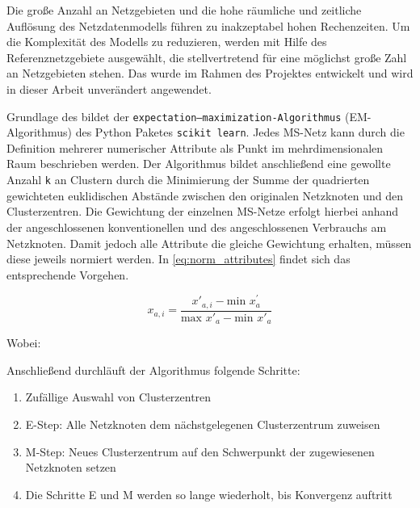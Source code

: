 Die große Anzahl an Netzgebieten und die hohe räumliche und zeitliche Auflösung des Netzdatenmodells führen zu inakzeptabel hohen Rechenzeiten.
Um die Komplexität des Modells zu reduzieren, werden mit Hilfe des \kmeans Referenznetzgebiete ausgewählt, die stellvertretend für eine möglichst große Zahl an Netzgebieten stehen.
Das \kmeans wurde im Rahmen des \openego Projektes entwickelt und wird in dieser Arbeit unverändert angewendet. \cite{Mueller2019}\medskip

Grundlage des \kmeans bildet der \texttt{expectation–maximization-Algorithmus} (EM-Algorithmus) des Python Paketes \texttt{scikit learn}. \cite{scikit-learn2011}
Jedes \gls{MS}-Netz kann durch die Definition mehrerer numerischer Attribute als Punkt im mehrdimensionalen Raum beschrieben werden.
Der Algorithmus bildet anschließend eine gewollte Anzahl \texttt{k} an Clustern durch die Minimierung der Summe der quadrierten gewichteten euklidischen Abstände zwischen den originalen Netzknoten und den Clusterzentren.
Die Gewichtung der einzelnen \gls{MS}-Netze erfolgt hierbei anhand der angeschlossenen konventionellen und des angeschlossenen Verbrauchs am Netzknoten.
Damit jedoch alle Attribute die gleiche Gewichtung erhalten, müssen diese jeweils normiert werden.
In \autoref{eq:norm_attributes} findet sich das entsprechende Vorgehen.

\begin{equation}
	x_{a, i} = \frac{x'_{a, i} - \text{min~} x^{'}_a}{\text{max~} x'_a - \text{min~} x'_a}
	\label{eq:norm_attributes}
\end{equation}

\noindent Wobei:


\noindent Anschließend durchläuft der Algorithmus folgende Schritte:

\begin{enumerate}
	\item Zufällige Auswahl von Clusterzentren
	\item E-Step: Alle Netzknoten dem nächstgelegenen Clusterzentrum zuweisen
	\item M-Step: Neues Clusterzentrum auf den Schwerpunkt der zugewiesenen Netzknoten setzen
	\item Die Schritte E und M werden so lange wiederholt, bis Konvergenz auftritt
\end{enumerate}

